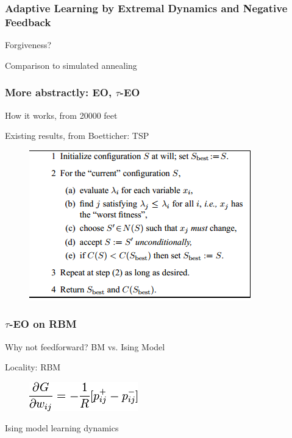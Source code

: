\documentclass{beamer}
\begin{document}
\begin{frame}
  \frametitle{Adaptive Learning by Extremal Dynamics and Negative Feedback}
  Forgiveness?

  Comparison to simulated annealing
\end{frame}

\begin{frame}
  \frametitle{More abstractly: EO, $\tau$-EO}
  How it works, from 20000 feet

  Existing results, from Boetticher: TSP
  \begin{figure}
    \includegraphics{eo_alg}
  \end{figure}
\end{frame}

\begin{frame}
  \frametitle{$\tau$-EO on RBM}
  Why not feedforward? BM vs. Ising Model

  Locality: RBM

  \begin{figure}
    \includegraphics{rbm_eq}
  \end{figure}

  Ising model learning dynamics


\end{frame}
\end{document}
